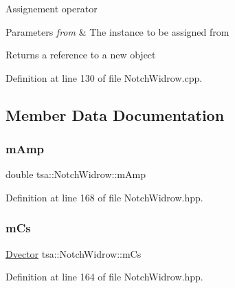 Assignement operator


\begin{DoxyParams}{Parameters}
{\em from} & The instance to be assigned from\\
\hline
\end{DoxyParams}
\begin{DoxyReturn}{Returns}
a reference to a new object 
\end{DoxyReturn}


Definition at line 130 of file Notch\+Widrow.\+cpp.



\subsection{Member Data Documentation}
\mbox{\label{classtsa_1_1_notch_widrow_acbc33d87e8a0dd156dacf5bfe40ff493}} 
\subsubsection{\texorpdfstring{m\+Amp}{mAmp}}
{\footnotesize\ttfamily double tsa\+::\+Notch\+Widrow\+::m\+Amp\hspace{0.3cm}{\ttfamily [private]}}



Definition at line 168 of file Notch\+Widrow.\+hpp.

\mbox{\label{classtsa_1_1_notch_widrow_afa8a7585ecbd88d110ab096e344d2c0c}} 
\subsubsection{\texorpdfstring{m\+Cs}{mCs}}
{\footnotesize\ttfamily \hyperlink{namespacetsa_a8900fb03d849baf447a1a0efe2561fb2}{Dvector} tsa\+::\+Notch\+Widrow\+::m\+Cs\hspace{0.3cm}{\ttfamily [private]}}



Definition at line 164 of file Notch\+Widrow.\+hpp.

\mbox{\label{classtsa_1_1_notch_widrow_a391286f42ba0dbede784bc90446833e4}} 
